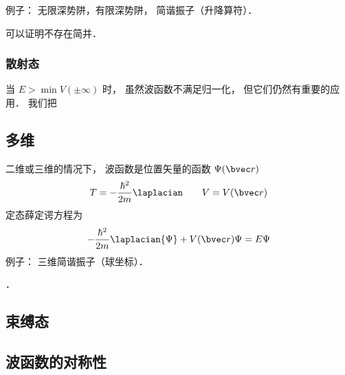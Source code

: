 例子： 无限深势阱，有限深势阱， 简谐振子（升降算符）．

可以证明不存在简并．

\subsubsection{散射态}
当 $E > \min V(\pm\infty)$ 时， 虽然波函数不满足归一化， 但它们仍然有重要的应用． 我们把


\subsection{多维}
二维或三维的情况下， 波函数是位置矢量的函数 $\Psi(\bvec r)$
\begin{equation}
T = -\frac{\hbar^2}{2m} \laplacian \qquad V = V(\bvec r)
\end{equation}
定态薛定谔方程为
\begin{equation}
-\frac{\hbar^2}{2m} \laplacian {\Psi} + V(\bvec r)\Psi = E \Psi
\end{equation}
例子： 三维简谐振子（球坐标）．

．

\subsection{束缚态}

\subsection{波函数的对称性}

